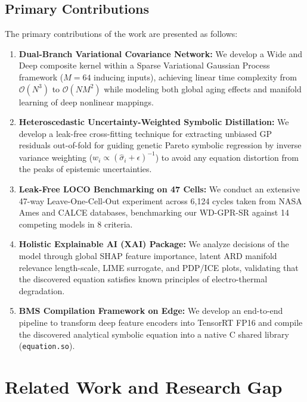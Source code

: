 \documentclass[a4paper,fleqn]{cas-sc}
\begin{document}
\subsection{Primary Contributions}
The primary contributions of the work are presented as follows:
\begin{enumerate}
    \item \textbf{Dual-Branch Variational Covariance Network:} We develop a Wide and Deep composite kernel within a Sparse Variational Gaussian Process framework ($M=64$ inducing inputs), achieving linear time complexity from $\mathcal{O}(N^3)$ to $\mathcal{O}(NM^2)$ while modeling both global aging effects and manifold learning of deep nonlinear mappings.
    \item \textbf{Heteroscedastic Uncertainty-Weighted Symbolic Distillation:} We develop a leak-free cross-fitting technique for extracting unbiased GP residuals out-of-fold for guiding genetic Pareto symbolic regression by inverse variance weighting ($w_i \propto (\hat{\sigma}_i + \epsilon)^{-1}$) to avoid any equation distortion from the peaks of epistemic uncertainties.
    \item \textbf{Leak-Free LOCO Benchmarking on 47 Cells:} We conduct an extensive 47-way Leave-One-Cell-Out experiment across 6,124 cycles taken from NASA Ames and CALCE databases, benchmarking our WD-GPR-SR against 14 competing models in 8 criteria.
    \item \textbf{Holistic Explainable AI (XAI) Package:} We analyze decisions of the model through global SHAP feature importance, latent ARD manifold relevance length-scale, LIME surrogate, and PDP/ICE plots, validating that the discovered equation satisfies known principles of electro-thermal degradation.
    \item \textbf{BMS Compilation Framework on Edge:} We develop an end-to-end pipeline to transform deep feature encoders into TensorRT FP16 and compile the discovered analytical symbolic equation into a native C shared library (\texttt{equation.so}).
\end{enumerate}

\section{Related Work and Research Gap}
\end{document}
